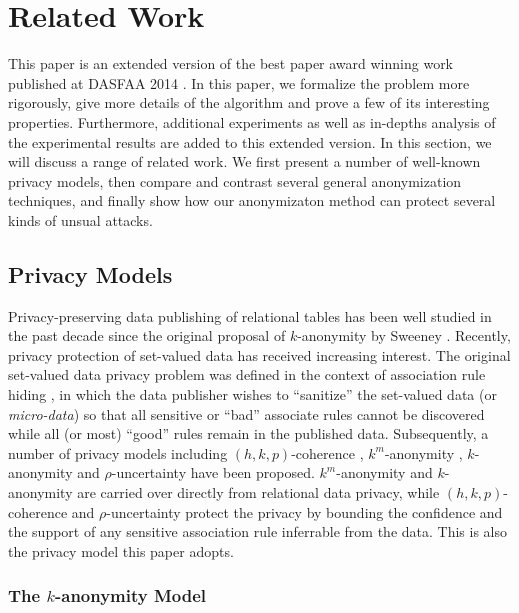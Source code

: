 \section{Related Work}
\label{sec:related}
This paper is an extended version of the best
paper award winning work published at DASFAA 2014 \cite{JiaPXZL14}.
In this paper, we formalize the problem more rigorously, 
give more details of the algorithm and prove a few of its 
interesting properties. Furthermore, additional 
experiments as well as in-depths analysis of the experimental results
are added to this extended version. In this section, we will discuss
a range of related work. We first present a number 
of well-known privacy models, then compare and contrast several general
anonymization techniques, and finally show how our anonymizaton method
can protect several kinds of unsual attacks.
 
\subsection{Privacy Models}

Privacy-preserving data publishing of relational tables has been well
studied in the past decade since the original proposal of $k$-anonymity by
Sweeney \etal \cite{Sweeney2002:k-anonymity}.
Recently, privacy protection of set-valued data has received increasing
interest. The original set-valued data privacy problem was defined in the
context of association rule hiding 
\cite{atallah99:disclosure,tkde:VerykiosEBSD04:ARH,tkde:WuCC07:hiding}, 
in which the data publisher
wishes to ``sanitize'' the set-valued data (or {\em micro-data}) so that all
sensitive or ``bad'' associate rules cannot be discovered while all (or most)
``good'' rules remain in the published data.
Subsequently, a number of privacy models
including $(h,k,p)$-coherence \cite{Xu:2008:ATD},
$k^m$-anonymity \cite{Terrovitis:2008:PAS},
$k$-anonymity \cite{He:2009:ASD} and
$\rho$-uncertainty \cite{Cao:2010:rho} have been proposed.
$k^m$-anonymity and $k$-anonymity are carried over directly from
relational data privacy,
while $(h,k,p)$-coherence and $\rho$-uncertainty protect the
privacy by bounding the confidence and the support of
any sensitive association rule inferrable from the data. This is
also the privacy model this paper adopts.

\subsubsection{The $k$-anonymity Model}

